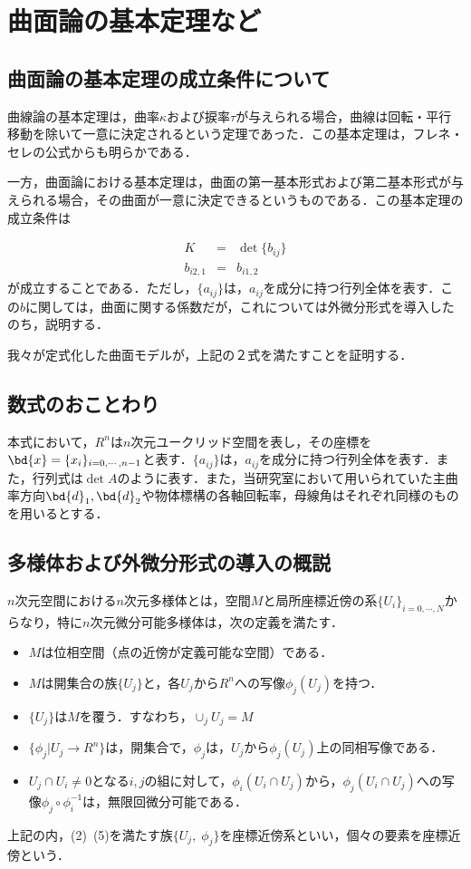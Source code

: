 \section{曲面論の基本定理など}
	\subsection{曲面論の基本定理の成立条件について}
		曲線論の基本定理は，曲率$ \kappa $および捩率$ \tau $が与えられる場合，曲線は回転・平行移動を除いて一意に決定されるという定理であった．この基本定理は，フレネ・セレの公式からも明らかである．
		
		一方，曲面論における基本定理は，曲面の第一基本形式および第二基本形式が与えられる場合，その曲面が一意に決定できるというものである．この基本定理の成立条件は
		
		\begin{eqnarray}\label{eq:SurfaceConds}
			K &=& \det \{ b_{ij} \} \\
			b_{i2,1} &=& b_{i1,2}
		\end{eqnarray}
		が成立することである．ただし，$ \{ a_{ij}\} $は，$ a_{ij} $を成分に持つ行列全体を表す．この$ b $に関しては，曲面に関する係数だが，これについては外微分形式を導入したのち，説明する．
		
		我々が定式化した曲面モデルが，上記の２式を満たすことを証明する．
	\subsection{数式のおことわり}
		本式において，$ R^n $は$ n $次元ユークリッド空間を表し，その座標を$ \bd{x} = \{ x_i\}_{i=0,\cdots , n-1} $と表す．$ \{ a_{ij}\} $は，$ a_{ij} $を成分に持つ行列全体を表す．また，行列式は$ \det A $のように表す．また，当研究室において用いられていた主曲率方向$ \bd{d}_1,\bd{d}_2 $や物体標構の各軸回転率，母線角はそれぞれ同様のものを用いるとする．
	
	\subsection{多様体および外微分形式の導入の概説}
		$ n $次元空間における$ n $次元多様体とは，空間$ M $と局所座標近傍の系$ \{U_i\}_{i=0,\cdots ,N} $からなり，特に$ n $次元微分可能多様体は，次の定義を満たす．
		\begin{itemize}
			\item $ M $は位相空間（点の近傍が定義可能な空間）である．
			\item $ M $は開集合の族$ \{ U_j \} $と，各$ U_j $から$ R^n $への写像$ \phi_j(U_j) $を持つ．
			\item $ \{ U_j \} $は$ M $を覆う．すなわち，$ \cup_j  U_j  = M$
			\item $ \{ \phi_j | U_j \rightarrow R^n\} $は，開集合で，$ \phi_j $は，$ U_j $から$ \phi_j (U_j) $上の同相写像である．
			\item $ U_j \cap U_i \neq 0$となる$ i,j $の組に対して，$ \phi_i(U_i \cap U_j) $から，$ \phi_j(U_i \cap U_j) $への写像$ \phi_j \circ  \phi_i^{-1} $は，無限回微分可能である．
		\end{itemize}
		上記の内，(2)~(5)を満たす族$ \{ U_j,\; \phi_j\} $を座標近傍系といい，個々の要素を座標近傍という．
		
